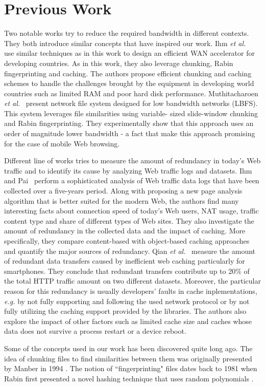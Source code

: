 \section{Previous Work}\label{sec:rel_work}
Two notable works try to reduce the required bandwidth in different contexts. They both introduce similar concepts that have
inspired our work. Ihm \textit{et al.}~\cite{wanax} use similar techniques as in this work to design an efficient WAN accelerator for developing countries. As in this work, they also leverage chunking, Rabin fingerprinting and caching. 
The authors propose efficient chunking and caching schemes to handle the challenges brought by the equipment in developing world countries such as limited RAM and poor hard disk performance. Muthitacharoen \textit{et al.}~\cite{lbfs} present 
network file system designed for low bandwidth networks (LBFS). This system leverages file similarities using variable-
sized slide-window chunking and Rabin fingerprinting. They experimentally show that this approach uses an order of
magnitude lower bandwidth - a fact that make this approach promising for the case of mobile Web browsing.

Different line of works tries to measure the amount of redundancy in today's Web traffic and to identify its cause by
analyzing Web traffic logs and datasets. Ihm and Pai~\cite{modern_web_traffic} perform a sophisticated analysis of Web traffic data logs that have been collected over a five-years period. Along with proposing a new page analysis algorithm 
that is better suited for the modern Web, the authors find many interesting facts about connection speed of today's Web users, NAT usage, traffic content type and share of different types of Web sites. They also investigate the amount of redundancy in the collected data and the impact of caching. More specifically, they compare content-based with object-based caching approaches and quantify the major sources of redundancy. Qian \textit{et al.}~\cite{web_caching} measure the 
amount of redundant data transfers caused by inefficient web caching particularly for smartphones. They conclude that redundant transfers contribute up to 20\% of the total HTTP traffic amount on two different datasets. Moreover, the particular reason for this redundancy is usually developers' faults in cache inplementations, \textit{e.g.} by not fully supporting and following the used network protocol or by not fully utilizing the caching support provided by the libraries. The authors also explore the impact of other factors such as limited cache size and caches whose data does not survive a process restart or a device reboot.

Some of the concepts used in our work has been discovered quite long ago. The idea of chunking files to find 
similarities between them was originally presented by Manber in 1994 \cite{manber}. The notion of ``fingerprinting" 
files dates back to 1981 when Rabin first presented a novel hashing technique that uses random polynomials \cite{rabin}.
